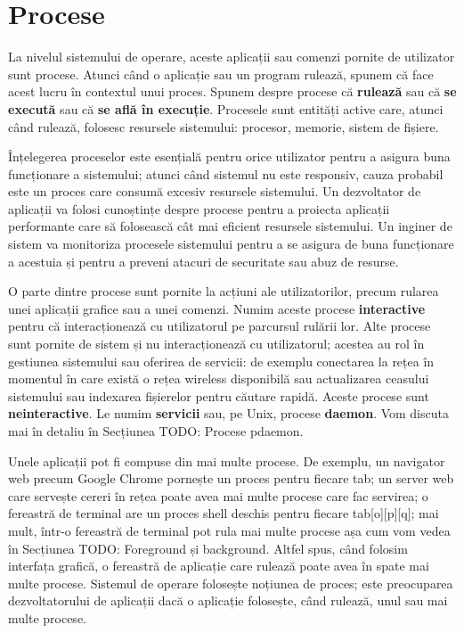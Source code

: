 \chapter{Procese}
\label{chapter:procese}

La nivelul sistemului de operare, aceste aplicații sau comenzi pornite de
utilizator sunt procese.  Atunci când o aplicație sau un program rulează, spunem
că face acest lucru în contextul unui proces.  Spunem despre procese că
\textbf{rulează} sau că \textbf{se execută} sau că \textbf{se află în execuție}.
Procesele sunt entități active care, atunci când rulează, folosesc resursele
sistemului: procesor, memorie, sistem de fișiere.

Înțelegerea proceselor este esențială pentru orice utilizator pentru a asigura
buna funcționare a sistemului; atunci când sistemul nu este responsiv, cauza
probabil este un proces care consumă excesiv resursele sistemului. Un
dezvoltator de aplicații va folosi cunoștințe despre procese pentru a proiecta
aplicații performante care să folosească cât mai eficient resursele sistemului.
Un inginer de sistem va monitoriza procesele sistemului pentru a se asigura de
buna funcționare a acestuia și pentru a preveni atacuri de securitate sau abuz
de resurse.

O parte dintre procese sunt pornite la acțiuni ale utilizatorilor, precum
rularea unei aplicații grafice sau a unei comenzi. Numim aceste procese
\textbf{interactive} pentru că interacționează cu utilizatorul pe parcursul rulării lor.
Alte procese sunt pornite de sistem și nu interacționează cu utilizatorul;
acestea au rol în gestiunea sistemului sau oferirea de servicii: de exemplu
conectarea la rețea în momentul în care există o rețea wireless disponibilă sau
actualizarea ceasului sistemului sau indexarea fișierelor pentru căutare rapidă.
Aceste procese sunt \textbf{neinteractive}. Le numim \textbf{servicii} sau, pe Unix, procese
\textbf{daemon}. Vom discuta mai în detaliu în Secțiunea TODO: Procese pdaemon.

Unele aplicații pot fi compuse din mai multe procese. De exemplu, un navigator
web precum Google Chrome pornește un proces pentru fiecare tab; un server web
care servește cereri în rețea poate avea mai multe procese care fac servirea; o
fereastră de terminal are un proces shell deschis pentru fiecare tab[o][p][q];
mai mult, într-o fereastră de terminal pot rula mai multe procese așa cum vom
vedea în Secțiunea TODO: Foreground și background. Altfel spus, când folosim
interfața grafică, o fereastră de aplicație care rulează poate avea în spate mai
multe procese. Sistemul de operare folosește noțiunea de proces; este
preocuparea dezvoltatorului de aplicații dacă o aplicație folosește, când
rulează, unul sau mai multe procese.

